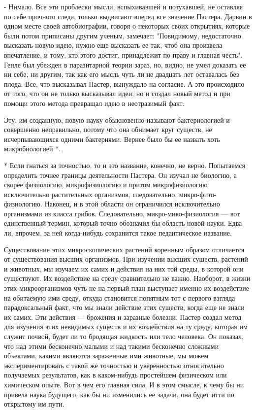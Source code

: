 -  Нимало.  Все  эти   проблески  мысли,  вспыхивавшей  и  потухавшей,
не  оставляя  по себе  прочного  следа,  только выдвигают  вперед  все
значение Пастера. Дарвин  в одном месте своей  автобиографии, говоря о
некоторых своих открытиях, которые были потом приписаны другим ученым,
замечает: "Повидимому,  недостаточно высказать  новую идею,  нужно еще
высказать ее  так, чтоб она  произвела впечатление, и тому,  кто этого
достиг, принадлежит  по праву  и главная честь".  Генле был  убежден в
паразитарной теории зараз, но, видно, не  умел доказать ее ни себе, ни
другим,  так как  его мысль  чуть ли  не двадцать  лет оставалась  без
плода.  Все,  что высказывал  Пастер,  вынуждало  на согласие.  А  это
происходило от  того, что он  не только  высказывал идеи, но  и создал
новый метод  и при  помощи этого метода  превращал идею  в неотразимый
факт.

Эту, им  созданную, новую науку обыкновенно  называют бактериологией и
совершенно  неправильно,  потому что  она  обнимает  круг существ,  не
исчерпывающихся  одними бактериями.  Вернее  было бы  ее назвать  хоть
микробиологией *.

*  Если  гнаться  за  точностью,   то  и  это  название,  конечно,  не
верно.  Попытаемся  определить  точнее границы  деятельности  Пастера.
Он   изучал  не   биологию,  а   скорее  физиологию,   микрофизиологию
и  притом   микрофизиологию  исключительно   растительных  организмов,
следовательно,  микро-фито-физиологию. Наконец,  и в  этой области  он
ограничился исключительно организмами из класса грибов. Следовательно,
микро-мико-физиология  ---  вот  единственный  термин,  который  точно
обозначил  бы   область  новой  науки.   Едва  ли,  впрочем,   за  ней
когда-нибудь сохранится такое педантическое название.

Существование   этих   микроскопических  растений   коренным   образом
отличается  от существования  высших организмов.  При изучении  высших
существ,  растений и  животных,  мы  изучаем их  самих  и действия  на
них  той среды,  в которой  они  существуют. Их  воздействие на  среду
сравнительно не важно. Наоборот, в  жизни этих микроорганизмов чуть не
на первый план выступает именно их воздействие на обитаемую ими среду,
откуда становится попятным тот  с первого взгляда парадоксальный факт,
что мы знали  действие этих существ, когда еще не  знали их самих. Эти
действия  --- брожения  и заразные  болезни. Пастер  создал метод  для
изучения этих невидимых существ и  их воздействия на ту среду, которая
им служит почвой, будет ли то  бродящая жидкость или тело человека. Он
показал,  что над  этими  бесконечно малыми  и  над такими  бесконечно
сложными объектами, какими являются  зараженные ими животные, мы можем
экспериментировать с  такой же  точностью и  уверенностью относительно
получаемых результатов,  как в каком-нибудь простейшем  физическом или
химическом опыте. Вот в чем его главная  сила. И в этом смысле, к чему
бы ни  привела наука  будущего, как  бы ни  изменились ее  задачи, она
будет итти по открытому им пути.

